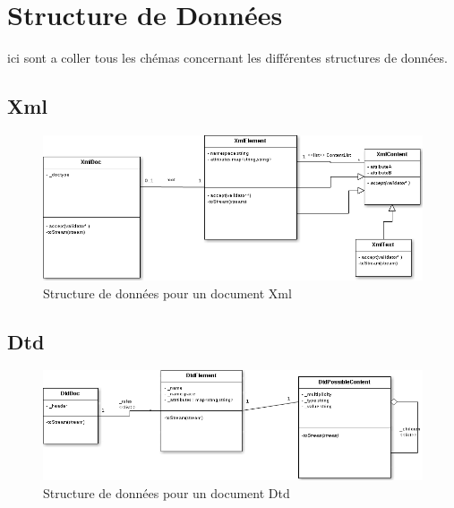 \section{Structure de Données}
ici sont a coller tous les chémas concernant les différentes structures de données.

\subsection{Xml}
\begin{figure}[H]
	\begin{center}
		\includegraphics[scale=0.5]{IMG/XmlStructures.png}
		\caption{Structure de données pour un document Xml}
	\end{center}
\end{figure}

\subsection{Dtd}
\begin{figure}[H]
	\begin{center}
		\includegraphics[scale=0.5]{IMG/DtdStructures.png}
		\caption{Structure de données pour un document Dtd}
	\end{center}
\end{figure}


